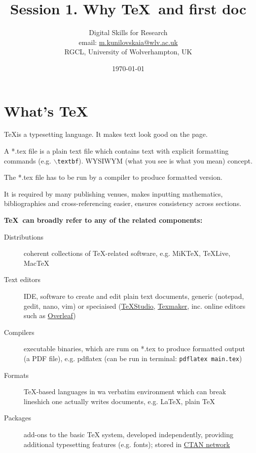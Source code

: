 \documentclass[a4paper,11pt]{article}  %
\title{Session 1. Why \TeX~and first doc}
\author{Digital Skills for Research \\ 
	email: \href{m.kunilovskaia@wlv.ac.uk}{m.kunilovskaia@wlv.ac.uk} \\ 
	RGCL, University of Wolverhampton, UK}
\date{\today}
\begin{document}
\maketitle

\tableofcontents


\section{What's \TeX}
\begin{tcolorbox}[width=\textwidth,colback={yellow!50!white}]
	\TeX is a typesetting language. It makes text look good on the page. 
	\medskip
	
	
	A *.tex file is a plain text file which contains text with explicit formatting commands (e.g. \texttt{$\backslash$textbf}). WYSIWYM (what you see is what you mean) concept.
	
	The *.tex file has to be run by a compiler to produce formatted version.
	
	\medskip
	It is required by many publishing venues, makes inputting mathematics, bibliographies and cross-referencing easier, ensures consistency across sections.
	
\end{tcolorbox}   

\vspace{1em}

\textbf{\Large{\TeX~can broadly refer to any of the related components:}}

\begin{description}
	\item[Distributions] coherent collections of TeX-related software, e.g. MiKTeX, TeXLive, MacTeX
	\item[Text editors] IDE, software to create and edit plain text documents, generic (notepad, gedit, nano, vim) or speciaised (\href{http://texstudio.sourceforge.net/}{TeXStudio}, \href{https://www.xm1math.net/texmaker/}{Texmaker}, inc. online editors such as \href{https://www.overleaf.com}{Overleaf})
	\item[Compilers] executable binaries, which are rum on *.tex to produce formatted output (a PDF file), e.g. pdflatex (can be run in terminal: \texttt{pdflatex main.tex})
	\item[Formats] TeX-based languages in wa verbatim environment which can break lineshich one actually writes documents, e.g. LaTeX, plain TeX
	\item[Packages] add-ons to the basic TeX system, developed independently, providing additional typesetting features (e.g. fonts); stored in \href{https://ctan.org/}{CTAN network}
\end{description}
\end{document}
